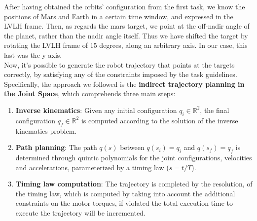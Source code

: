 After having obtained the orbits' configuration from the first task, we know the positions of Mars and Earth in a certain time window, and expressed in the LVLH frame. Then, as regards the mars target, we point at the off-nadir angle of the planet, rather than the nadir angle itself. Thus we have shifted the target by rotating the LVLH frame of 15 degrees, along an arbitrary axis. In our case, this last was the y-axis.\\
Now, it's possible to generate the robot trajectory that points at the targets correctly, by satisfying any of the constraints imposed by the task guidelines. Specifically, the approach we followed is the \textbf{indirect trajectory planning in the Joint Space}, which comprehends three main steps:
\begin{enumerate}
    \item \textbf{Inverse kinematics}: Given any initial configuration $q_i \in \mathbb{R}^2$, the final configuration $q_f \in \mathbb{R}^2$ is computed according to the solution of the inverse kinematics problem.
    \item \textbf{Path planning}: The path $q(s)$ between $q(s_i) = q_i$ and $q(s_f) = q_f$ is determined through quintic polynomials for the joint configurations, velocities and accelerations, parameterized by a timing law ($s=t/T$).
    \item \textbf{Timing law computation}: The trajectory is completed by the resolution, of the timing law, which is computed by taking into account the additional constraints on the motor torques, if violated the total execution time to execute the trajectory will be incremented.
    
\end{enumerate}

